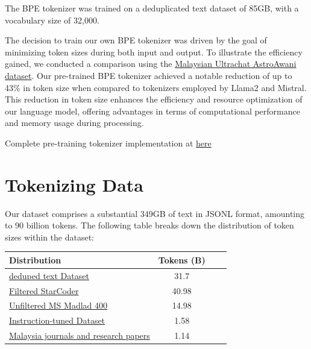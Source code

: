 \documentclass[preprint]{article}
\begin{document}
The BPE tokenizer was trained on a deduplicated text dataset of 85GB, with a vocabulary size of 32,000.

The decision to train our own BPE tokenizer was driven by the goal of minimizing token sizes during both input and output. To illustrate the efficiency gained, we conducted a comparison using the \href{https://huggingface.co/datasets/mesolitica/malaysian-ultrachat}{Malaysian Ultrachat AstroAwani dataset}. Our pre-trained BPE tokenizer achieved a notable reduction of up to 43\% in token size when compared to tokenizers employed by Llama2 and Mistral. This reduction in token size enhances the efficiency and resource optimization of our language model, offering advantages in terms of computational performance and memory usage during processing.

Complete pre-training tokenizer implementation at \href{https://github.com/malaysia-ai/prepare-tokenizer}{here}

\section{Tokenizing Data}

Our dataset comprises a substantial 349GB of text in JSONL format, amounting to 90 billion tokens. The following table breaks down the distribution of token sizes within the dataset:

\begin{table}[h]
  \centering
  \begin{tabular}{lccl}
    \hline
    \textbf{Distribution}                                                                                                                                                & \textbf{Tokens (B)} \\
    \hline
    \href{https://github.com/malaysia-ai/dedup-text-dataset/blob/main/pretrain-llm/prepare-dedup-text-dataset-4096.ipynb}{deduped text Dataset}                          & 31.7                \\
    \href{https://github.com/malaysia-ai/dedup-text-dataset/blob/main/pretrain-llm/prepare-starcoder-4096.ipynb}{Filtered StarCoder} \cite{li2023starcoder}              & 40.98               \\
    \href{https://github.com/malaysia-ai/dedup-text-dataset/blob/main/pretrain-llm/prepare-starcoder-4096.ipynb}{Unfiltered MS Madlad 400} \cite{kudugunta2023madlad400} & 14.98               \\
    \href{https://github.com/malaysia-ai/dedup-text-dataset/blob/main/pretrain-llm/prepare-instructions.ipynb}{Instruction-tuned Dataset}                                & 1.58                \\
    \href{https://github.com/malaysia-ai/dedup-text-dataset/blob/main/pretrain-llm/prepare-extra.ipynb}{Malaysia journals and research papers}                           & 1.14                \\
    \hline
  \end{tabular}
\end{table}
\end{document}
